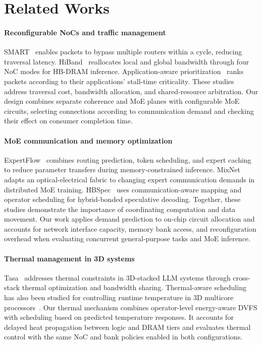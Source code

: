 \documentclass[conference,10pt]{IEEEtran}
\begin{document}
\FloatBarrier

\section{Related Works}
\label{sec:related-works}

\paragraph{Reconfigurable NoCs and traffic management}
SMART~\cite{krishna2013smart} enables packets to bypass multiple routers
within a cycle, reducing traversal latency. HiBand~\cite{wang2026hiband}
reallocates local and global bandwidth through four NoC modes for
HB-DRAM inference. Application-aware prioritization~\cite{das2009priority}
ranks packets according to their applications' stall-time criticality.
These studies address traversal cost, bandwidth allocation, and
shared-resource arbitration. Our design combines separate coherence and
MoE planes with configurable MoE circuits, selecting connections according
to communication demand and checking their effect on consumer completion time.

\paragraph{MoE communication and memory optimization}
ExpertFlow~\cite{he2026expertflow} combines routing prediction, token
scheduling, and expert caching to reduce parameter transfers during
memory-constrained inference. MixNet~\cite{liao2025mixnet} adapts an
optical-electrical fabric to changing expert communication demands in
distributed MoE training. HBSpec~\cite{wang2026hbspec} uses
communication-aware mapping and operator scheduling for hybrid-bonded
speculative decoding. Together, these studies demonstrate the importance
of coordinating computation and data movement. Our work applies demand
prediction to on-chip circuit allocation and accounts for network interface
capacity, memory bank access, and reconfiguration overhead when evaluating
concurrent general-purpose tasks and MoE inference.

\paragraph{Thermal management in 3D systems}
Tasa~\cite{he2025tasa} addresses thermal constraints in 3D-stacked LLM
systems through cross-stack thermal optimization and bandwidth sharing.
Thermal-aware scheduling has also been studied for controlling runtime
temperature in 3D multicore processors~\cite{tsai2016thermal}.
Our thermal mechanism combines operator-level energy-aware DVFS with
scheduling based on predicted temperature responses. It accounts for
delayed heat propagation between logic and DRAM tiers and evaluates
thermal control with the same NoC and bank policies enabled in both
configurations.
\end{document}
